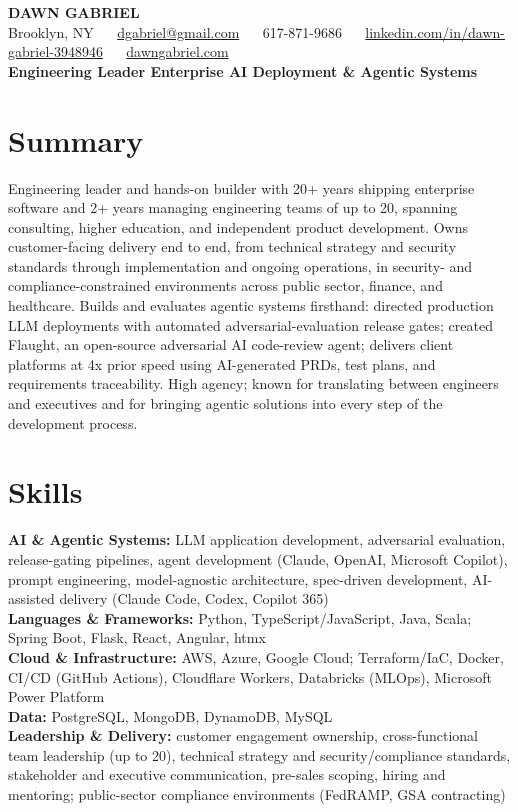 \documentclass[10pt,letterpaper]{article}
\begin{document}
{\fontsize{19}{21}\selectfont\bfseries DAWN GABRIEL}\\[3pt]
{\small Brooklyn, NY ~\textbar~ \href{mailto:dgabriel@gmail.com}{dgabriel@gmail.com} ~\textbar~ 617-871-9686 ~\textbar~ \href{https://www.linkedin.com/in/dawn-gabriel-3948946}{linkedin.com/in/dawn-gabriel-3948946} ~\textbar~ \href{https://www.dawngabriel.com}{dawngabriel.com}}\\[4pt]
{\normalsize\bfseries Engineering Leader \textbar{} Enterprise AI Deployment \& Agentic Systems}

\section*{Summary}
{\small
Engineering leader and hands-on builder with 20+ years shipping enterprise software and 2+ years managing engineering teams of up to 20, spanning consulting, higher education, and independent product development. Owns customer-facing delivery end to end, from technical strategy and security standards through implementation and ongoing operations, in security- and compliance-constrained environments across public sector, finance, and healthcare. Builds and evaluates agentic systems firsthand: directed production LLM deployments with automated adversarial-evaluation release gates; created Flaught, an open-source adversarial AI code-review agent; delivers client platforms at 4x prior speed using AI-generated PRDs, test plans, and requirements traceability. High agency; known for translating between engineers and executives and for bringing agentic solutions into every step of the development process.
}

\section*{Skills}
{\small
\textbf{AI \& Agentic Systems:} LLM application development, adversarial evaluation, release-gating pipelines, agent development (Claude, OpenAI, Microsoft Copilot), prompt engineering, model-agnostic architecture, spec-driven development, AI-assisted delivery (Claude Code, Codex, Copilot 365)\\[2pt]
\textbf{Languages \& Frameworks:} Python, TypeScript/JavaScript, Java, Scala; Spring Boot, Flask, React, Angular, htmx\\[2pt]
\textbf{Cloud \& Infrastructure:} AWS, Azure, Google Cloud; Terraform/IaC, Docker, CI/CD (GitHub Actions), Cloudflare Workers, Databricks (MLOps), Microsoft Power Platform\\[2pt]
\textbf{Data:} PostgreSQL, MongoDB, DynamoDB, MySQL\\[2pt]
\textbf{Leadership \& Delivery:} customer engagement ownership, cross-functional team leadership (up to 20), technical strategy and security/compliance standards, stakeholder and executive communication, pre-sales scoping, hiring and mentoring; public-sector compliance environments (FedRAMP, GSA contracting)
}
\end{document}
